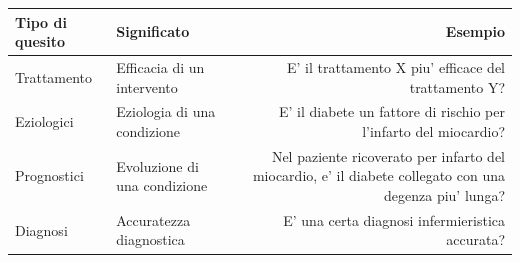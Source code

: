 \documentclass[]{book}
\begin{document}
\begin{longtable}[]{@{}llr@{}}
\toprule
\begin{minipage}[b]{0.30\columnwidth}\raggedright
Tipo di quesito\strut
\end{minipage} & \begin{minipage}[b]{0.30\columnwidth}\raggedright
Significato\strut
\end{minipage} & \begin{minipage}[b]{0.30\columnwidth}\raggedleft
Esempio\strut
\end{minipage}\tabularnewline
\midrule
\endhead
\begin{minipage}[t]{0.30\columnwidth}\raggedright
Trattamento\strut
\end{minipage} & \begin{minipage}[t]{0.30\columnwidth}\raggedright
Efficacia di un intervento\strut
\end{minipage} & \begin{minipage}[t]{0.30\columnwidth}\raggedleft
E' il trattamento X piu' efficace del trattamento Y?\strut
\end{minipage}\tabularnewline
\begin{minipage}[t]{0.30\columnwidth}\raggedright
Eziologici\strut
\end{minipage} & \begin{minipage}[t]{0.30\columnwidth}\raggedright
Eziologia di una condizione\strut
\end{minipage} & \begin{minipage}[t]{0.30\columnwidth}\raggedleft
E' il diabete un fattore di rischio per l'infarto del miocardio?\strut
\end{minipage}\tabularnewline
\begin{minipage}[t]{0.30\columnwidth}\raggedright
Prognostici\strut
\end{minipage} & \begin{minipage}[t]{0.30\columnwidth}\raggedright
Evoluzione di una condizione\strut
\end{minipage} & \begin{minipage}[t]{0.30\columnwidth}\raggedleft
Nel paziente ricoverato per infarto del miocardio, e' il diabete collegato con una degenza piu' lunga?\strut
\end{minipage}\tabularnewline
\begin{minipage}[t]{0.30\columnwidth}\raggedright
Diagnosi\strut
\end{minipage} & \begin{minipage}[t]{0.30\columnwidth}\raggedright
Accuratezza diagnostica\strut
\end{minipage} & \begin{minipage}[t]{0.30\columnwidth}\raggedleft
E' una certa diagnosi infermieristica accurata?\strut
\end{minipage}\tabularnewline
\bottomrule
\end{longtable}
\end{document}
